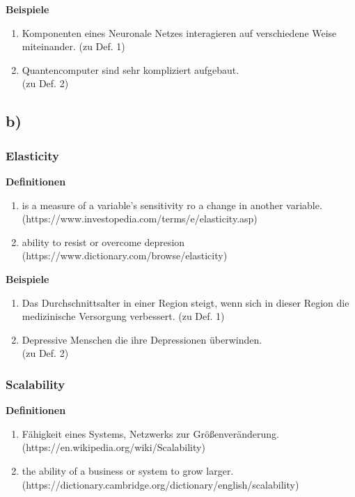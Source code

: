 \documentclass[a4paper, 15pt]{scrartcl}
\begin{document}
					\textbf{Beispiele}
					\begin{enumerate}
						\item Komponenten eines Neuronale Netzes interagieren auf verschiedene Weise miteinander. (zu Def. 1)
		
						\item Quantencomputer sind sehr kompliziert aufgebaut. \\(zu Def. 2)
					\end{enumerate}
	
	\newpage
	
			\subsection*{b)}
				\subsubsection*{Elasticity}
					\textbf{Definitionen}
					\begin{enumerate}
						\item \grqq[...] is a measure of a variable's sensitivity ro a change in another variable.\grqq \\
						(https://www.investopedia.com/terms/e/elasticity.asp)
		
						\item \grqq [...] ability to resist or overcome depresion\grqq\\ (https://www.dictionary.com/browse/elasticity)
					\end{enumerate}
	
					\textbf{Beispiele}
					\begin{enumerate}
						\item Das Durchschnittsalter in einer Region steigt, wenn sich in dieser Region die medizinische Versorgung verbessert. (zu Def. 1)
		
						\item Depressive Menschen die ihre Depressionen überwinden.\\(zu Def. 2)
					\end{enumerate}
	
	
				\subsubsection*{Scalability}
					\textbf{Definitionen}
					\begin{enumerate}
						\item \grqq[...] Fähigkeit eines Systems, Netzwerks zur Größenveränderung.\grqq \\(https://en.wikipedia.org/wiki/Scalability)
		
						\item \grqq the ability of a business or system to grow larger.\grqq\\ (https://dictionary.cambridge.org/dictionary/english/scalability)
					\end{enumerate}
	
\end{document}
